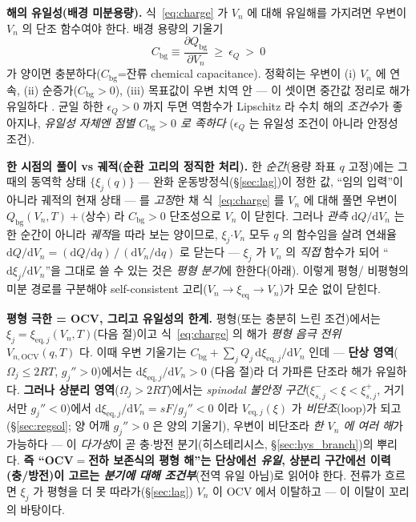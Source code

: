 \documentclass[11pt,a4paper]{article}
\newcommand{\dd}{\mathrm{d}}
\newcommand{\eq}{\mathrm{eq}}
\newcommand{\bg}{\mathrm{bg}}
\newcommand{\OCV}{\mathrm{OCV}}
\begin{document}
\textbf{해의 유일성(배경 미분용량).} 식~\eqref{eq:charge} 가 $V_n$ 에 대해 유일해를 가지려면 우변이 $V_n$ 의
단조 함수여야 한다. 배경 용량의 기울기
\begin{equation}
C_\bg\equiv\frac{\partial Q_\bg}{\partial V_n}\ \ge\ \epsilon_Q\ >\ 0
\label{eq:cbg}
\end{equation}
가 양이면 충분하다($C_\bg$=잔류 chemical capacitance). 정확히는 우변이 (i) $V_n$ 에 연속, (ii) 순증가($C_\bg>0$),
(iii) 목표값이 우변 치역 안 — 이 셋이면 중간값 정리로 해가 유일하다 \cite{bazant2013}. 균일 하한 $\epsilon_Q>0$
까지 두면 역함수가 Lipschitz 라 수치 해의 \emph{조건수}가 좋아지나, \emph{유일성 자체엔 점별 $C_\bg>0$ 로 족하다}
($\epsilon_Q$ 는 유일성 조건이 아니라 안정성 조건).

\textbf{한 시점의 풀이 vs 궤적(순환 고리의 정직한 처리).} 한 \emph{순간}(용량 좌표 $q$ 고정)에는 그때의 동역학 상태
$\{\xi_j(q)\}$ — 완화 운동방정식(\S\ref{sec:lag})이 정한 값, ``임의 입력''이 아니라 궤적의 현재 상태 — 를 \emph{고정}한
채 식~\eqref{eq:charge} 를 $V_n$ 에 대해 풀면 우변이 $Q_\bg(V_n,T)+\text{(상수)}$ 라 $C_\bg>0$ 단조성으로 $V_n$ 이
닫힌다. 그러나 \emph{관측} $\dd Q/\dd V_n$ 는 한 순간이 아니라 \emph{궤적}을 따라 보는 양이므로, $\xi_j$$\cdot$$V_n$
모두 $q$ 의 함수임을 살려 연쇄율 $\dd Q/\dd V_n=(\dd Q/\dd q)\,/\,(\dd V_n/\dd q)$ 로 닫는다 — $\xi_j$ 가 $V_n$ 의
\emph{직접} 함수가 되어 ``$\dd\xi_j/\dd V_n$''을 그대로 쓸 수 있는 것은 \emph{평형 분기}에 한한다(아래). 이렇게 평형/
비평형의 미분 경로를 구분해야 self-consistent 고리($V_n\!\to\!\xi_{\eq}\!\to\!V_n$)가 모순 없이 닫힌다.

\textbf{평형 극한 = OCV, 그리고 유일성의 한계.} 평형(또는 충분히 느린 조건)에서는 $\xi_j=\xi_{\eq,j}(V_n,T)$(다음
절)이고 식~\eqref{eq:charge} 의 해가 \emph{평형 음극 전위} $V_{n,\OCV}(q,T)$ 다. 이때 우변 기울기는 $C_\bg+\sum_j
Q_j\,\dd\xi_{\eq,j}/\dd V_n$ 인데 — \textbf{단상 영역}($\Omega_j\le2RT$, $g_j''>0$)에서는 $\dd\xi_{\eq,j}/\dd V_n>0$
(다음 절)라 더 가파른 단조라 해가 유일하다. \textbf{그러나 상분리 영역}($\Omega_j>2RT$)에서는 \emph{spinodal 불안정 구간}($\xi_{s,j}^-<\xi<\xi_{s,j}^+$, 거기서만
$g_j''<0$)에서 $\dd\xi_{\eq,j}/\dd V_n=sF/g_j''<0$ 이라 $V_{\eq,j}(\xi)$ 가 \emph{비단조}(loop)가 되고(\S\ref{sec:regsol};
양 어깨 $g_j''>0$ 은 양의 기울기), 우변이 비단조라 \emph{한 $V_n$ 에 여러 해}가 가능하다 — 이 \emph{다가성}이 곧
충$\cdot$방전 분기(히스테리시스, \S\ref{sec:hys_branch})의 뿌리다.
\textbf{즉 ``OCV$=$전하 보존식의 평형 해''는 단상에선 \emph{유일}, 상분리 구간에선 이력(충/방전)이 고르는 \emph{분기에
대해 조건부}}(전역 유일 아님)로 읽어야 한다. 전류가 흐르면 $\xi_j$ 가 평형을 더 못 따라가(\S\ref{sec:lag}) $V_n$ 이
OCV 에서 이탈하고 — 이 이탈이 꼬리의 바탕이다.
\end{document}
